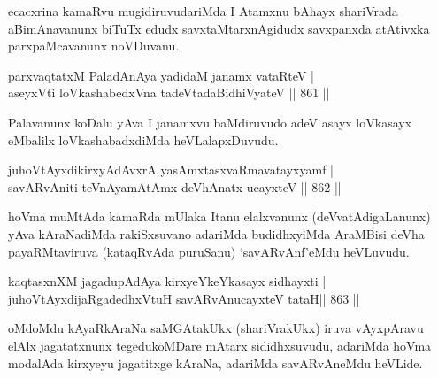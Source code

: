 \begin{artha}
ecacxrina kamaRvu mugidiruvudariMda I Atamxnu bAhayx shariVrada aBimAnavanunx biTuTx edudx savxtaMtarxnAgidudx savxpanxda atAtivxka parxpaMcavanunx noVDuvanu.
\end{artha}


\begin{shl}
parxvaqtatxM PaladAnAya yadidaM janamx vataRteV | \\
aseyxVti loVkashabedxVna tadeVtadaBidhiVyateV \hfill||  861 ||  
\end{shl}

\begin{artha}
Palavanunx koDalu yAva I janamxvu baMdiruvudo adeV asayx loVkasayx eMbalilx loVkashabadxdiMda heVLalapxDuvudu.
\end{artha}


\begin{shl}
juhoVtAyxdikirxyAdAvxrA yasAmxtasxvaRmavatayxyamf | \\
savARvAniti teVnAyamAtAmx deVhAnatx ucayxteV \hfill||  862 ||  
\end{shl}

\begin{artha}
hoVma muMtAda kamaRda mUlaka Itanu elalxvanunx (deVvatAdigaLanunx) yAva kAraNadiMda rakiSxsuvano adariMda budidhxyiMda AraMBisi deVha payaRMtaviruva (kataqRvAda puruSanu) `savARvAnf'eMdu heVLuvudu.
\end{artha}


\begin{shl}
kaqtasxnXM jagadupAdAya kirxyeYkeYkasayx sidhayxti | \\
juhoVtAyxdijaRgadedhxVtuH savARvAnucayxteV tataH\hfill ||  863 || 
\end{shl}

\begin{artha}
oMdoMdu kAyaRkAraNa saMGAtakUkx (shariVrakUkx) iruva vAyxpAravu elAlx jagatatxnunx tegedukoMDare mAtarx sididhxsuvudu, adariMda hoVma modalAda kirxyeyu jagatitxge kAraNa, adariMda savARvAneMdu heVLide.
\end{artha}


